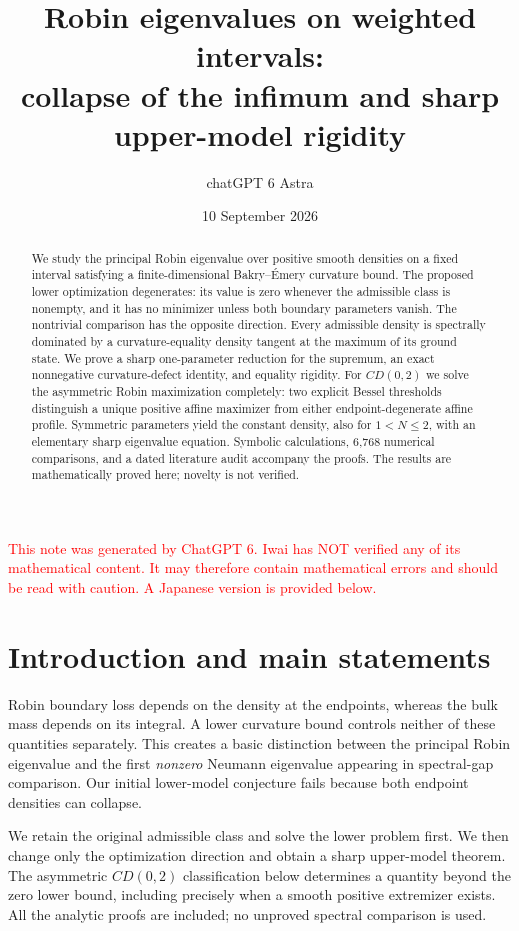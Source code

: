 \documentclass[12pt]{amsart}
\title[Robin extrema on weighted intervals]{Robin eigenvalues on weighted intervals:\\
collapse of the infimum and sharp upper-model rigidity}
\author{chatGPT 6 Astra}
\date{10 September 2026}
\theoremstyle{definition}
\theoremstyle{remark}
\numberwithin{equation}{section}
\newcommand{\xr}[1]{\textcolor{red}{#1}}
\begin{document}
\begin{abstract}
We study the principal Robin eigenvalue over positive smooth densities on a fixed interval satisfying a finite-dimensional Bakry--\'Emery curvature bound. The proposed lower optimization degenerates: its value is zero whenever the admissible class is nonempty, and it has no minimizer unless both boundary parameters vanish. The nontrivial comparison has the opposite direction. Every admissible density is spectrally dominated by a curvature-equality density tangent at the maximum of its ground state. We prove a sharp one-parameter reduction for the supremum, an exact nonnegative curvature-defect identity, and equality rigidity. For $CD(0,2)$ we solve the asymmetric Robin maximization completely: two explicit Bessel thresholds distinguish a unique positive affine maximizer from either endpoint-degenerate affine profile. Symmetric parameters yield the constant density, also for $1<N\le2$, with an elementary sharp eigenvalue equation. Symbolic calculations, 6,768 numerical comparisons, and a dated literature audit accompany the proofs. The results are mathematically proved here; novelty is not verified.
\end{abstract}
\maketitle

\xr{This note was generated by ChatGPT 6. Iwai has NOT verified any of its mathematical content. It may therefore contain mathematical errors and should be read with caution. A Japanese version is provided below.}


\section{Introduction and main statements}
Robin boundary loss depends on the density at the endpoints, whereas the bulk mass depends on its integral. A lower curvature bound controls neither of these quantities separately. This creates a basic distinction between the principal Robin eigenvalue and the first \emph{nonzero} Neumann eigenvalue appearing in spectral-gap comparison. Our initial lower-model conjecture fails because both endpoint densities can collapse.

We retain the original admissible class and solve the lower problem first. We then change only the optimization direction and obtain a sharp upper-model theorem. The asymmetric $CD(0,2)$ classification below determines a quantity beyond the zero lower bound, including precisely when a smooth positive extremizer exists. All the analytic proofs are included; no unproved spectral comparison is used.
\end{document}
